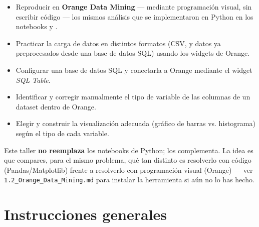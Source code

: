 \documentclass[11pt,letterpaper]{article}
\begin{document}
\begin{itemize}[leftmargin=1.2cm]
  \item Reproducir en \textbf{Orange Data Mining} --- mediante programación visual, sin escribir código --- los mismos análisis que se implementaron en Python en los notebooks \texttt{} y \texttt{}.
  \item Practicar la carga de datos en distintos formatos (CSV, y datos ya preprocesados desde una base de datos SQL) usando los widgets de Orange.
  \item Configurar una base de datos SQL y conectarla a Orange mediante el widget \textit{SQL Table}.
  \item Identificar y corregir manualmente el tipo de variable de las columnas de un dataset dentro de Orange.
  \item Elegir y construir la visualización adecuada (gráfico de barras vs. histograma) según el tipo de cada variable.
\end{itemize}

\begin{nota}
Este taller \textbf{no reemplaza} los notebooks de Python; los complementa. La idea es que compares, para el mismo problema, qué tan distinto es resolverlo con código (Pandas/Matplotlib) frente a resolverlo con programación visual (Orange) --- ver \texttt{1.2\_Orange\_Data\_Mining.md} para instalar la herramienta si aún no lo has hecho.
\end{nota}

\section{Instrucciones generales}
\end{document}

